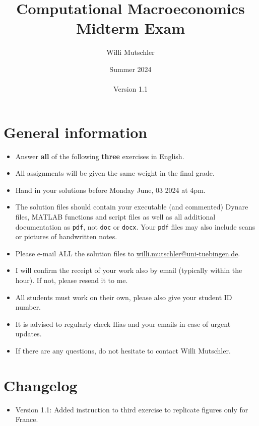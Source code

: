 \documentclass[a4paper]{scrartcl}
\begin{document}
	
\title{Computational Macroeconomics\\Midterm Exam}
\author{Willi Mutschler}
\date{Summer 2024\\~\\Version 1.1}
\maketitle

\section*{General information}

\begin{itemize}
\item
Answer \textbf{all} of the following \textbf{three} exercises in English.
\item
All assignments will be given the same weight in the final grade.
\item
Hand in your solutions before Monday June, 03 2024 at 4pm.
\item
The solution files should contain your executable (and commented) Dynare files, MATLAB functions and script files
  as well as all additional documentation as \texttt{pdf}, not \texttt{doc} or \texttt{docx}.
Your \texttt{pdf} files may also include scans or pictures of handwritten notes.
\item
Please e-mail ALL the solution files to \url{willi.mutschler@uni-tuebingen.de}.
\item
I will confirm the receipt of your work also by email (typically within the hour). If not, please resend it to me.
\item
All students must work on their own, please also give your student ID number.
\item
It is advised to regularly check Ilias and your emails in case of urgent updates.
\item
If there are any questions, do not hesitate to contact Willi Mutschler.
\end{itemize}

\section*{Changelog}
\begin{itemize}
\item Version 1.1: Added instruction to third exercise to replicate figures only for France.
\end{itemize}
\end{document}
